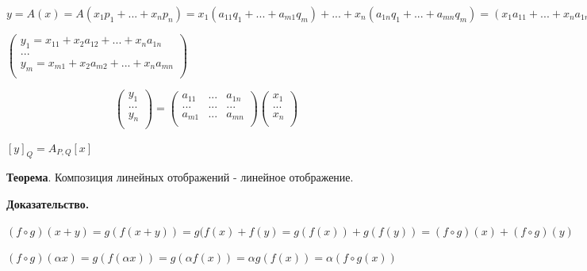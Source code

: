 \documentclass[a4paper]{article}
\begin{document}
    $y = A(x) = A(x_1p_1 + ... + x_np_n) = x_1(a_{11}q_1 + ... + a_{m1}q_m) + ... + x_n(a_{1n}q_1 + ... + a_{mn}q_m) = (x_1a_{11} + ... + x_na_{1n})q_1 + ... + (x_1a_{21} + ... + x_na_{2n}) + ...$

    $\displaystyle \begin{pmatrix}
                       y_1 = x_{11} + x_2a_{12} + ... + x_na_{1n} \\
                       ...                                        \\
                       y_m = x_{m1} + x_2a_{m2} + ... + x_na_{mn} \\
    \end{pmatrix}$

    \begin{equation}
        \displaystyle \begin{pmatrix}
                          y_1 \\
                          ... \\
                          y_n \\
        \end{pmatrix} = \begin{pmatrix}
                            a_{11} & ... & a_{1n} \\
                            ...    & ... & ...    \\
                            a_{m1} & ... & a_{mn} \\
        \end{pmatrix} \begin{pmatrix}
                          x_1 \\
                          ... \\
                          x_n \\
        \end{pmatrix}
    \end{equation}

    $\left[y \right]_Q = A_{P,Q} \left[ x \right]$

    \begin{htheorem}
        \textbf{Теорема}. Композиция линейных отображений - линейное отображение.
    \end{htheorem}

    \begin{hproof}
        \textbf{Доказательство.}

        $(f \circ g)(x+y) = g(f(x+y)) = g(f(x) + f(y) = g(f(x)) + g(f(y)) = (f \circ g)(x) + (f \circ g)(y)$

        $(f \circ g)(\alpha x) = g(f(\alpha x)) = g(\alpha f(x)) = \alpha g(f(x)) = \alpha (f \circ g(x))$
    \end{hproof}
\end{document}
